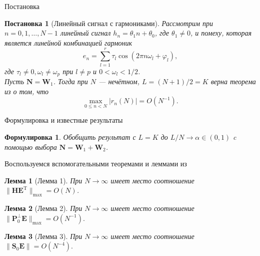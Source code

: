 \documentclass[notheorems, handout]{beamer}
\newtheorem{lemma}{Лемма}
\newtheorem{formulation}{Формулировка}
\newtheorem{statement}{Постановка}
\begin{document}
	\begin{frame}{Постановка}
		\begin{statement}[Линейный сигнал с гармониками]
			Рассмотрим при $n=0,1,\dots,N-1$ линейный сигнал $h_n = \theta_1n+\theta_0$, где $\theta_1 \neq 0$, и помеху, которая является линейной комбинацией гармоник
			\begin{equation*}
				e_n = \sum^r_{l=1}\tau_l\cos(2\pi n\omega_l + \varphi_l),
			\end{equation*} 
			\emph{где} $\tau_l\neq0, \omega_l \neq \omega_p$ \emph{при} $l\neq p$ и $0 < \omega_l < 1/2$.
			\\
			Пусть $\mathbf{N} = \mathbf{W}_1$. Тогда при $N$ --- нечётном, $L=(N+1)/2=K$ верна теорема из \cite{ZNekrutkin} о том, что
			\begin{equation*}
				\max_{0\leqslant n<N}|r_n(N)|=O(N^{-1}).
			\end{equation*}
		\end{statement}
	\end{frame}
	\begin{frame}{Формулировка и известные результаты}
		\begin{formulation}
			\emph{Обобщить результат \cite{ZNekrutkin} с $L=K$ до $L/N\to \alpha \in (0,1)$ c помощью выбора $\mathbf{N}=\mathbf{W}_1+\mathbf{W}_2$}.
		\end{formulation}
		Воспользуемся вспомогательными теоремами и леммами из \cite{ZNekrutkin}
		\begin{lemma}[Лемма 1]\label{lem:2}
			При $N\rightarrow\infty$ имеет место соотношение $\|\mathbf{HE}^\mathrm{T}\|_{\max} = O(N)$.
		\end{lemma}
		\begin{lemma}[Лемма 2]
			При $N\rightarrow\infty$ имеет место соотношение $\|\mathbf{P}_0^{\bot}\mathbf{E}\|_{\max} = O(N^{-1}).$
		\end{lemma}
		\begin{lemma}[Лемма 3]
			При $N\rightarrow\infty$ имеет место соотношение $\|\mathbf{S}_0\mathbf{E}\|=O(N^{-4}).$
		\end{lemma}
	\end{frame}
\end{document}
